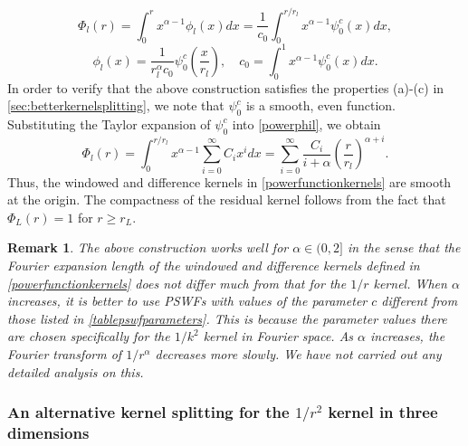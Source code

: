 \documentclass[final,letterpaper]{siamart171218}
\newtheorem{remark}[theorem]{Remark}
\newcommand{\be}{\begin{equation}}
\newcommand{\ee}{\end{equation}}
\newcommand{\psic}{{\psi_0^c}}
\newcommand{\cR}{r}
\begin{document}
\be\label{powerphil}
\Phi_l(r) = \int_0^{r} x^{\alpha-1}\phi_l(x)dx = \frac{1}{c_0} \int_0^{r/\cR_l}x^{\alpha-1}\psic(x)dx,
\ee  
\be
\phi_l(x) = \frac{1}{\cR_l^{\alpha} c_0}\psic\left(\frac{x}{\cR_l}\right),
\quad
c_0 = \int_{0}^1 x^{\alpha-1}\psic(x)dx.
\ee
In order to verify that the above construction satisfies the properties (a)-(c) in
\cref{sec:betterkernelsplitting}, we note that $\psic$ is a smooth, even function.
Substituting the Taylor expansion of $\psic$ into \cref{powerphil}, we obtain
\be
\Phi_l(r)=\int_0^{r/\cR_l}x^{\alpha-1}\sum_{i=0}^\infty C_i x^idx
=\sum_{i=0}^\infty \frac{C_i}{i+\alpha} \left(\frac{r}{\cR_l}\right)^{\alpha+i}.
\ee
Thus, the windowed and difference kernels in \cref{powerfunctionkernels}
are smooth at the origin. The compactness of the residual kernel follows
from the fact that $\Phi_L(r) = 1$ for $r\ge \cR_L$.

\begin{remark}
  The above construction works well for $\alpha\in (0,2]$ in the sense that
    the Fourier expansion length of the windowed and difference kernels defined in
    \cref{powerfunctionkernels} does not differ much from that for the $1/r$ kernel.
    When $\alpha$ increases, it is better to use PSWFs with values of the 
    parameter $c$ different from those listed in \cref{tablepswfparameters}. 
    This is because the parameter values there are chosen specifically for the 
    $1/k^2$ kernel in Fourier space. 
    As $\alpha$ increases, the Fourier transform of $1/r^\alpha$ decreases more slowly.
    We have not carried out any detailed analysis on this.
\end{remark}


\subsubsection{An alternative kernel splitting for the $1/r^2$ kernel in three dimensions}
\label{sl3dkernelsplitting}
\end{document}
